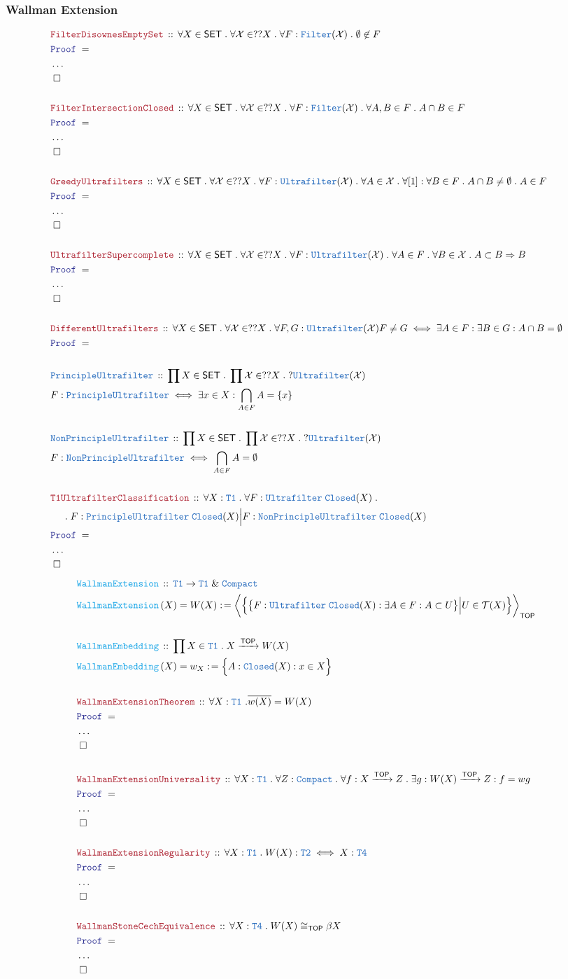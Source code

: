 \documentclass[12pt]{scrartcl}
\newcommand{\TYPE}[1]{\textcolor{NavyBlue}{\mathtt{#1}}}
\newcommand{\FUNC}[1]{\textcolor{Cerulean}{\mathtt{#1}}}
\newcommand{\LOGIC}[1]{\textcolor{Blue}{\mathtt{#1}}}
\newcommand{\THM}[1]{\textcolor{Maroon}{\mathtt{#1}}}
\renewcommand{\.}{\; . \;}
\newcommand{\de}{: \kern 0.1pc =}
\newcommand{\Act}[1]{\left( #1 \right)}
\newcommand{\Theorem}[2]{& \THM{#1} \, :: \, #2 \\ & \Proof = \\ }
\newcommand{\DeclareType}[2]{& \TYPE{#1} \, :: \, #2 \\}
\newcommand{\DefineType}[3]{& #1 : \TYPE{#2} \iff #3 \\}
\newcommand{\DeclareFunc}[2]{& \FUNC{#1} \, :: \, #2 \\}
\newcommand{\DefineNamedFunc}[4]{&  \FUNC{#1}\Act{#2} = #3 \de #4 \\}
\newcommand{\NewLine}{\\ & \kern 1pc}
\newcommand{\Page}[1]{ \begin{align*} #1 \end{align*}   }
\newcommand{\NoProof}{ & \ldots \\ \EndProof}
\renewcommand{\And}{\; \& \;}
\newcommand{\Imply}{\Rightarrow}
\newcommand{\Arrow}{\xrightarrow}
\newcommand{\QED}{\; \square}
\newcommand{\EndProof}{& \QED \\}
\newcommand{\Proof}{\LOGIC{Proof} \; }
\newcommand{\SET}{\mathsf{SET}}
\newcommand{\TOP}{\mathsf{TOP}}
\newcommand{\T}{\mathcal{T}}
\newcommand{\X}{\mathcal{X}}
\begin{document}
\subsubsection{Wallman Extension}
\Page{  
	\Theorem{FilterDisownesEmptySet}
	{
		\forall X \in  \SET \.
		\forall \X \in ??X \. 
		\forall F : \TYPE{Filter}(\X) \.
		\emptyset \not \in F 
	}
	\NoProof
	\\
	\Theorem{FilterIntersectionClosed}
	{
		\forall X \in  \SET \.
		\forall \X \in ??X \.
		\forall F : \TYPE{Filter}(\X) \.
		\forall A,B \in F \. A \cap B \in F 
	}
	\NoProof
	\\
	\Theorem{GreedyUltrafilters}
	{
		\forall X \in \SET \.
		\forall \X \in ??X \.
		\forall F : \TYPE{Ultrafilter}(\X) \.
		\forall A \in \X \.
		\forall [1] : \forall B \in F \. A \cap B \neq \emptyset \.
		A \in F 
	}
	\NoProof
	\\
	\Theorem{UltrafilterSupercomplete}
	{
		\forall X \in \SET \.
		\forall \X \in ??X \.
		\forall F : \TYPE{Ultrafilter}(\X) \.
		\forall A \in F \.
		\forall B \in \X \.
		 A \subset B \Imply B   
	}
	\NoProof
	\\
	\Theorem{DifferentUltrafilters}
	{
		\forall X \in \SET \.
		\forall \X \in ??X \.
		\forall F ,G : \TYPE{Ultrafilter}(\X)
		F \neq G \iff 
		\exists A \in F : \exists B \in G : A \cap B = \emptyset
	}
	\\
	\DeclareType{PrincipleUltrafilter}{\prod X \in \SET \. \prod \X \in ??X \. ?\TYPE{Ultrafilter}(\X)}
	\DefineType{F}{PrincipleUltrafilter}{ \exists x \in X :\bigcap_{A \in F} A = \{x\}   }
	\\
	\DeclareType{NonPrincipleUltrafilter}{\prod X \in \SET \. \prod \X \in ??X \. ?\TYPE{Ultrafilter}(\X) }
	\DefineType{F}{NonPrincipleUltrafilter}{\bigcap_{A \in F} A = \emptyset}
	\\
	\Theorem{T1UltrafilterClassification}{\forall X : \TYPE{T1} \. \forall F : \TYPE{Ultrafilter}\;\TYPE{Closed}(X) \.  \NewLine \.
		F : \TYPE{PrincipleUltrafilter}\;\TYPE{Closed}(X) \Big| F  : \TYPE{NonPrincipleUltrafilter}\;\TYPE{Closed}(X)  
	}
	\NoProof
}\Page{
	\DeclareFunc{WallmanExtension}{\TYPE{T1} \to \TYPE{T1} \And \TYPE{Compact}}
	\DefineNamedFunc{WallmanExtension}{X}{W(X)}{\bigg\langle \Big\{ \big\{ F : \TYPE{Ultrafilter}\;\TYPE{Closed}(X) : \exists A \in F : A \subset U   \big\} \Big| U \in \T(X)       \Big\} \bigg\rangle_{\TOP}}
	\\
	\DeclareFunc{WallmanEmbedding}{\prod X \in \TYPE{T1} \. X \Arrow{\TOP} W(X)}
	\DefineNamedFunc{WallmanEmbedding}{X}{w_X}{\Big\{ A : \TYPE{Closed}(X) : x \in X  \Big\}}
	\\
	\Theorem{WallmanExtensionTheorem}
	{
		\forall X : \TYPE{T1} \ . \overline{w(X)} = W(X)
	}
	\NoProof
	\\
	\Theorem{WallmanExtensionUniversality}
	{
		\forall X : \TYPE{T1} \. 
		\forall Z : \TYPE{Compact} \.
		\forall f : X \Arrow{\TOP} Z \.
		\exists g : W(X) \Arrow{\TOP} Z :
		f = wg              
	}
	\NoProof
	\\
	\Theorem{WallmanExtensionRegularity}
	{
		\forall X : \TYPE{T1} \.
		W(X) : \TYPE{T2} \iff  X : \TYPE{T4}
	}
	\NoProof
	\\
	\Theorem{WallmanStoneCechEquivalence}
	{
		\forall X : \TYPE{T4} \. W(X) \cong_{\TOP} \beta X  
           }
           \NoProof
}
\newpage
\end{document}
